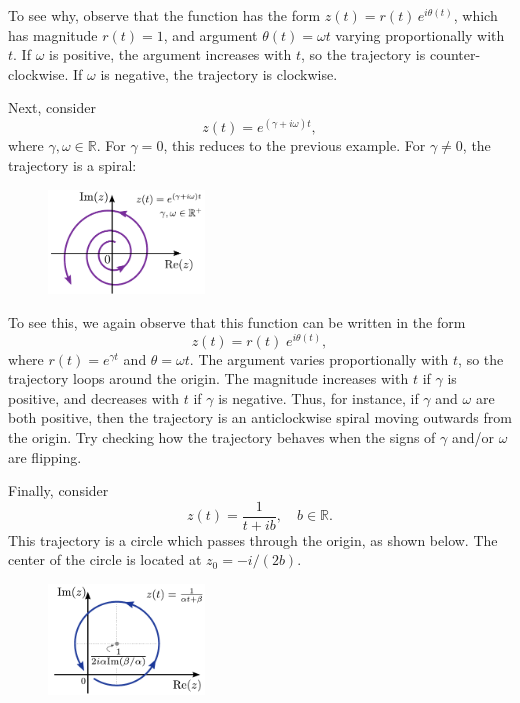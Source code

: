 \documentclass[10pt,a4paper]{article}
\begin{document}
\noindent
To see why, observe that the function has the form $z(t) =
r(t)\,e^{i\theta(t)}$, which has magnitude $r(t) = 1$, and argument
$\theta(t) = \omega t$ varying proportionally with $t$. If $\omega$ is
positive, the argument increases with $t$, so the trajectory is
counter-clockwise.  If $\omega$ is negative, the trajectory is
clockwise.

\clearpage

Next, consider
\begin{equation}
  z(t) = e^{(\gamma + i \omega) t},
\end{equation}
where $\gamma,\omega \in \mathbb{R}.$ For $\gamma = 0$, this reduces
to the previous example. For $\gamma \ne 0$, the trajectory is a
spiral:

\begin{figure}[ht]
  \centering\includegraphics[width=0.37\textwidth]{complex_trajectory_2}
\end{figure}

\noindent
To see this, we again observe that this function can be written in the
form
\begin{equation}
  z(t) = r(t) \;e^{i\theta(t)},
\end{equation}
where $r(t) = e^{\gamma t}$ and $\theta = \omega t.$ The argument
varies proportionally with $t$, so the trajectory loops around the
origin. The magnitude increases with $t$ if $\gamma$ is positive, and
decreases with $t$ if $\gamma$ is negative. Thus, for instance, if
$\gamma$ and $\omega$ are both positive, then the trajectory is an
anticlockwise spiral moving outwards from the origin. Try checking how
the trajectory behaves when the signs of $\gamma$ and/or $\omega$ are
flipping.

Finally, consider
\begin{equation}
  z(t) = \frac{1}{t + ib}, \quad b \in \mathbb{R}.
\end{equation}
This trajectory is a circle which passes through the origin, as shown
below.  The center of the circle is located at $z_0 = -i/(2b)$.

\begin{figure}[ht]
  \centering\includegraphics[width=0.37\textwidth]{complex_trajectory_3}
\end{figure}
\end{document}
